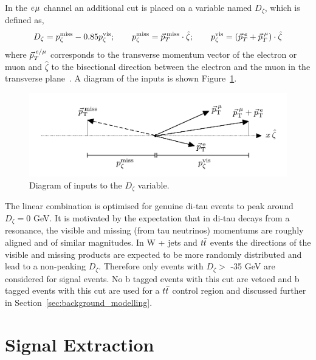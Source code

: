 In the $e_{}\mu_{}$ channel an additional cut is placed on a variable named $D_{\zeta}$, which is defined as,
\begin{equation}
D_\zeta = p_\zeta^\text{miss} - 0.85 p_\zeta^\text{vis};\qquad
p_\zeta^\text{miss} = \vec{p}_{T}^{\hspace{2pt}\text{miss}} \cdot \hat{\zeta};\qquad
p_\zeta^\text{vis} = (\vec{p}_{T}^{\hspace{2pt}e} + \vec{p}_{T}^{\hspace{2pt}\mu}) \cdot \hat{\zeta}
\label{eqn:Dzeta_def}
\end{equation}
where $\vec{p}_{T}^{\hspace{2pt}e/\mu}$ corresponds to the transverse momentum vector of the electron or muon and $\hat{\zeta}$ to the bisectional direction between the electron and the muon in the transverse plane~\cite{CDFPzeta}.
A diagram of the inputs is shown Figure~\ref{fig:dzeta_diagram}. \\
\begin{figure}[!hbtp]
\centering
    \includegraphics[width=1.0\textwidth]{Figures/dzeta_diagram.pdf}
\caption{Diagram of inputs to the $D_\zeta$ variable.}
\label{fig:dzeta_diagram}
\end{figure}

The linear combination is optimised for genuine di-tau events to peak around $D_{\zeta} = 0$ GeV. 
It is motivated by the expectation that in di-tau decays from a resonance, the visible and missing (from tau neutrinos) momentums are roughly aligned and of similar magnitudes.
In W + jets and $t\bar{t}$ events the directions of the visible and missing products are expected to be more randomly distributed and lead to a non-peaking $D_{\zeta}$.
Therefore only events with $D_\zeta >$ -35 GeV are considered for signal events.
No b tagged events with this cut are vetoed and b tagged events with this cut are used for a $t\bar{t}$ control region and discussed further in Section~\ref{sec:background_modelling}.

\newpage
\section{Signal Extraction}
\label{sec:sig_ext}

